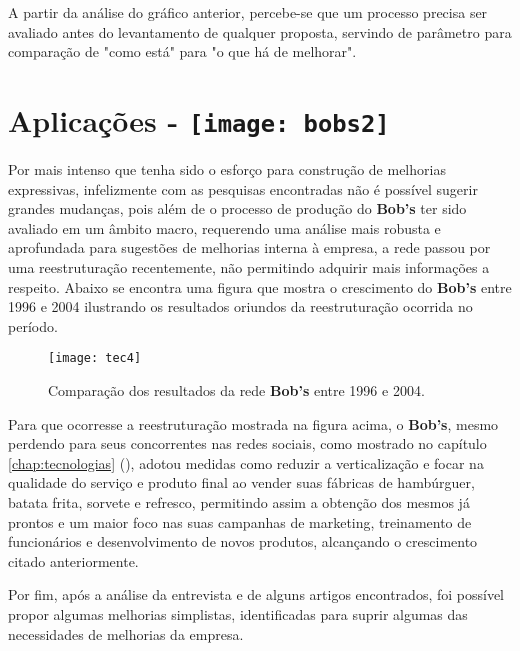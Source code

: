 		A partir da análise do gráfico anterior, percebe-se que um processo precisa ser avaliado antes do levantamento de qualquer proposta, servindo de parâmetro para comparação de "como está"  para "o que há de melhorar".

	\section[Aplicações]{Aplicações - \texttt{[image: bobs2]}}
	\label{sec:melhorias_aplicacoes}


		Por mais intenso que tenha sido o esforço para construção de melhorias expressivas, infelizmente com as pesquisas encontradas não é possível sugerir grandes mudanças, pois além de o processo de produção do \textbf{Bob's} ter sido avaliado em um âmbito macro, requerendo uma análise mais robusta e aprofundada para sugestões de melhorias interna à empresa, a rede passou por uma reestruturação recentemente, não permitindo adquirir mais informações a respeito. Abaixo se encontra uma figura que mostra o crescimento do \textbf{Bob's} entre 1996 e 2004 ilustrando os resultados oriundos da reestruturação ocorrida no período. 

		\begin{figure}[h]
			\centering
			\texttt{[image: tec4]}
			\caption[Comparação dos resultados da rede Bob’s entre 1996 e 2004 ]{Comparação dos resultados da rede \textbf{Bob’s} entre 1996 e 2004. \cite{osman}}
			\label{fig:tec4}
		\end{figure}

		Para que ocorresse a reestruturação mostrada na figura acima, o \textbf{Bob’s}, mesmo perdendo para seus concorrentes nas redes sociais, como mostrado no capítulo \ref{chap:tecnologias} (), adotou medidas como reduzir a verticalização e focar na qualidade do serviço e produto final ao vender suas fábricas de hambúrguer, batata frita, sorvete e refresco, permitindo assim a obtenção dos mesmos já prontos e um maior foco nas suas campanhas de marketing, treinamento de funcionários e desenvolvimento de novos produtos, alcançando o crescimento citado anteriormente. 

		Por fim, após a análise da entrevista e de alguns artigos encontrados, foi possível propor algumas melhorias simplistas, identificadas para suprir algumas das necessidades de melhorias da empresa.

